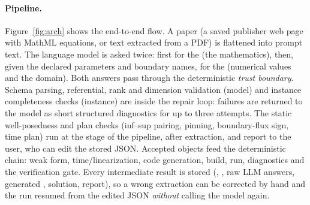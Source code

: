 \paragraph{Pipeline.}
Figure~\ref{fig:arch} shows the end-to-end flow. A paper (a saved publisher web page with MathML equations, or text extracted from a PDF) is flattened into prompt text. The language model is asked twice: first for the  (the mathematics), then, given the declared parameters and boundary names, for the  (numerical values and the domain). Both answers pass through the deterministic \emph{trust boundary}. Schema parsing, referential, rank and dimension validation (model) and instance completeness checks (instance) are inside the repair loop: failures are returned to the model as short structured diagnostics for up to three attempts. The static well-posedness and plan checks (inf--sup pairing, pinning, boundary-flux sign, time plan) run at the  stage of the pipeline, after extraction, and report to the user, who can edit the stored JSON. Accepted objects feed the deterministic chain: weak form, time/linearization, \dealii{} code generation, build, run, diagnostics and the verification gate. Every intermediate result is stored (, , raw LLM answers, generated , solution, report), so a wrong extraction can be corrected by hand and the run resumed from the edited JSON \emph{without} calling the model again.

